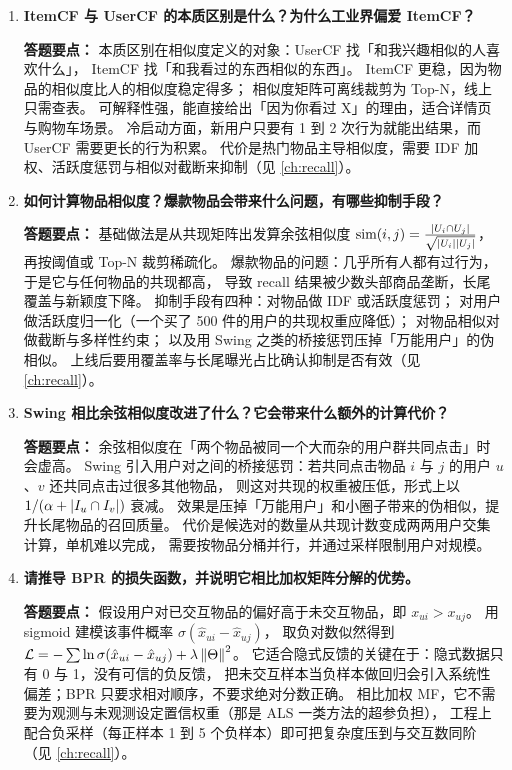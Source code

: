 \begin{interview}[题库与答题要点]
\begin{enumerate}[label=]
  \item[\textcolor{VioletDeep}{\textbf{Q4.}}] \textbf{ItemCF 与 UserCF 的本质区别是什么？为什么工业界偏爱 ItemCF？}
\par\smallskip\noindent\textcolor{VioletDeep}{\textbf{答题要点：}}
本质区别在相似度定义的对象：UserCF 找「和我兴趣相似的人喜欢什么」，
ItemCF 找「和我看过的东西相似的东西」。
ItemCF 更稳，因为物品的相似度比人的相似度稳定得多；
相似度矩阵可离线裁剪为 Top-N，线上只需查表。
可解释性强，能直接给出「因为你看过 X」的理由，适合详情页与购物车场景。
冷启动方面，新用户只要有 1 到 2 次行为就能出结果，而 UserCF 需要更长的行为积累。
代价是热门物品主导相似度，需要 IDF 加权、活跃度惩罚与相似对截断来抑制（见 \cref{ch:recall}）。

  \item[\textcolor{VioletDeep}{\textbf{Q5.}}] \textbf{如何计算物品相似度？爆款物品会带来什么问题，有哪些抑制手段？}
\par\smallskip\noindent\textcolor{VioletDeep}{\textbf{答题要点：}}
基础做法是从共现矩阵出发算余弦相似度
$\text{sim}(i,j) = \frac{\left\lvert U_i \cap U_j \right\rvert}{\sqrt{\left\lvert U_i \right\rvert\left\lvert U_j \right\rvert}}$，
再按阈值或 Top-N 裁剪稀疏化。
爆款物品的问题：几乎所有人都有过行为，于是它与任何物品的共现都高，
导致 recall 结果被少数头部商品垄断，长尾覆盖与新颖度下降。
抑制手段有四种：对物品做 IDF 或活跃度惩罚；
对用户做活跃度归一化（一个买了 500 件的用户的共现权重应降低）；
对物品相似对做截断与多样性约束；
以及用 Swing 之类的桥接惩罚压掉「万能用户」的伪相似。
上线后要用覆盖率与长尾曝光占比确认抑制是否有效（见 \cref{ch:recall}）。

  \item[\textcolor{VioletDeep}{\textbf{Q6.}}] \textbf{Swing 相比余弦相似度改进了什么？它会带来什么额外的计算代价？}
\par\smallskip\noindent\textcolor{VioletDeep}{\textbf{答题要点：}}
余弦相似度在「两个物品被同一个大而杂的用户群共同点击」时会虚高。
Swing 引入用户对之间的桥接惩罚：若共同点击物品 $i$ 与 $j$ 的用户 $u$、$v$ 还共同点击过很多其他物品，
则这对共现的权重被压低，形式上以 $1/(\alpha + \left\lvert I_u \cap I_v \right\rvert)$ 衰减。
效果是压掉「万能用户」和小圈子带来的伪相似，提升长尾物品的召回质量。
代价是候选对的数量从共现计数变成两两用户交集计算，单机难以完成，
需要按物品分桶并行，并通过采样限制用户对规模。

  \item[\textcolor{VioletDeep}{\textbf{Q7.}}] \textbf{请推导 BPR 的损失函数，并说明它相比加权矩阵分解的优势。}
\par\smallskip\noindent\textcolor{VioletDeep}{\textbf{答题要点：}}
假设用户对已交互物品的偏好高于未交互物品，即 $x_{ui} > x_{uj}$。
用 sigmoid 建模该事件概率 $\sigma(\hat{x}_{ui}-\hat{x}_{uj})$，
取负对数似然得到 $\mathcal{L} = -\sum \ln \sigma(\hat{x}_{ui}-\hat{x}_{uj}) + \lambda\left\lVert \Theta \right\rVert^2$。
它适合隐式反馈的关键在于：隐式数据只有 0 与 1，没有可信的负反馈，
把未交互样本当负样本做回归会引入系统性偏差；BPR 只要求相对顺序，不要求绝对分数正确。
相比加权 MF，它不需要为观测与未观测设定置信权重（那是 ALS 一类方法的超参负担），
工程上配合负采样（每正样本 1 到 5 个负样本）即可把复杂度压到与交互数同阶（见 \cref{ch:recall}）。


\end{enumerate}
\end{interview}
